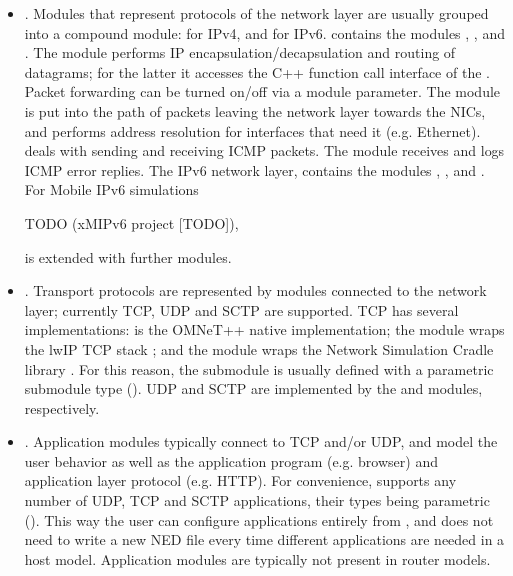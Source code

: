 \begin{itemize}
\item {}. Modules that represent protocols of the network
layer are usually grouped into a compound module: 
for IPv4, and  for IPv6. 
contains the modules , ,  and
. The  module performs IP
encapsulation/decapsulation and routing of datagrams; for the latter it
accesses the C++ function call interface of the .
Packet forwarding can be turned on/off via a module parameter. The
 module is put into the path of packets leaving the network
layer towards the NICs, and performs address resolution for interfaces that
need it (e.g. Ethernet).  deals with sending and receiving
ICMP packets. The  module receives and logs ICMP
error replies. The IPv6 network layer,  contains the
modules , , 
and . For Mobile IPv6 simulations 

\ifdraft TODO
(xMIPv6 project [TODO]),
\fi

 is extended with further modules.

\item {}. Transport protocols are represented
by modules connected to the network layer; currently TCP, UDP and SCTP are
supported. TCP has several implementations:  is the OMNeT++
native implementation; the  module wraps the lwIP TCP
stack \ifdraft [TODO] \fi; and the  module wraps the Network
Simulation Cradle library \ifdraft [TODO] \fi. For this reason, the  
submodule is usually defined with a parametric submodule type (). UDP and SCTP are implemented by the  and
 modules, respectively.

\item \sloppypar {}. Application modules typically connect to TCP
and/or UDP, and model the user behavior as well as the application program
(e.g. browser) and application layer protocol (e.g. HTTP). For convenience,
 supports any number of UDP, TCP and SCTP
applications, their types being parametric (). This way the user can configure applications entirely from
, and does not need to write a new NED file every time
different applications are needed in a host model. Application modules
are typically not present in router models.


\end{itemize}
